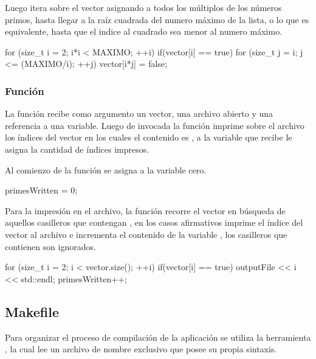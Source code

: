 \documentclass[12pt]{article}
\newenvironment{fullgrayverb}
{\verbbox}
{\endverbbox\par\colorbox{gray!25}{\parbox{\textwidth}{\theverbbox}}\par}
\begin{document}
Luego itera sobre el vector asignando  a todos los múltiplos de los
números primos, hasta llegar a la raíz cuadrada del numero máximo de la lista, o
lo que es equivalente, hasta que el indice al cuadrado sea menor al numero
máximo.

\begin{fullgrayverb}[\mbox{}]
for (size_t i = 2; i*i < MAXIMO; ++i) {
    if(vector[i] == true) {
        for (size_t j = i; j <= (MAXIMO/i); ++j) {
            vector[i*j] = false;
        }
    }
}
\end{fullgrayverb}

\subsubsection{Función }

La función  recibe como argumento un vector, una
archivo abierto y una referencia a una variable. Luego de invocada la función
imprime sobre el archivo los índices del vector en los cuales el contenido es
, a la variable que recibe le asigna la cantidad de índices impresos.

Al comienzo de la función se asigna a la variable  cero.

\begin{fullgrayverb}[\mbox{}]
primesWritten = 0;
\end{fullgrayverb}

Para la impresión en el archivo, la función recorre el vector en búsqueda de
aquellos casilleros que contengan , en los casos afirmativos imprime
el índice del vector al archivo e incrementa el contenido de la variable
, los casilleros que contienen  son ignorados.

\begin{fullgrayverb}[\mbox{}]
for (size_t i = 2; i < vector.size(); ++i) {
    if(vector[i] == true) {
        outputFile << i << std::endl;
        primesWritten++;
    }
}
\end{fullgrayverb}

\subsection{Makefile}

Para organizar el proceso de compilación de la aplicación se utiliza la
herramienta , la cual lee un archivo de nombre exclusivo
 que posee su propia sintaxis.
\end{document}
